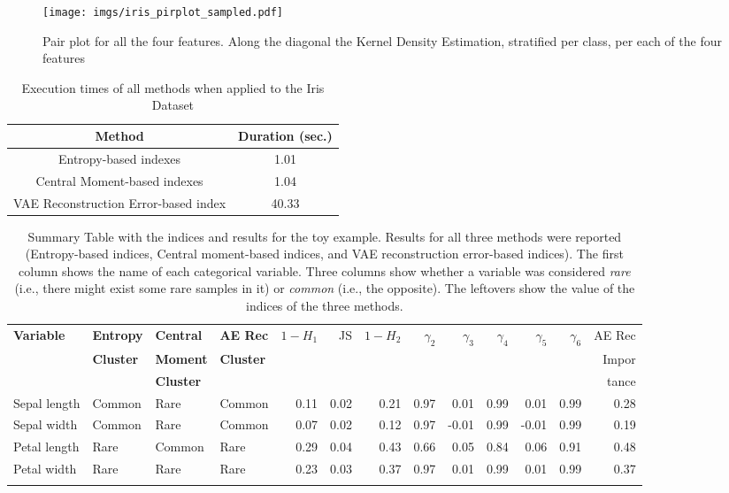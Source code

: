 \begin{figure}
    \centering
    \texttt{[image: imgs/iris\_pirplot\_sampled.pdf]}
    \caption{Pair plot for all the four features. Along the diagonal the Kernel Density Estimation, stratified per class, per each of the four features}
    \label{fig:toy_example_marginals}
\end{figure}
\begin{table}
    \centering
    \begin{tabular}{|c|c|}
    \hline
    \textbf{Method} & \textbf{Duration (sec.)} \\
    \hline
     Entropy-based indexes    &  1.01\\
     Central Moment-based indexes    & 1.04\\
     VAE Reconstruction Error-based index & 40.33\\
     \hline
    \end{tabular}
    \caption{Execution times of all methods when applied to the Iris Dataset}
    \label{tab: execution_times}
\end{table}
\begin{footnotesize}
\begin{longtable}{|l|l|l|l|r|r|r|r|r|r|r|r|r|}
    \hline
    \textbf{Variable}& \textbf{Entropy} & \textbf{Central} & \textbf{AE Rec} &     $1-H_1$ & JS & $1-H_2$ &  $\gamma_2$ &  $\gamma_3$ &  $\gamma_4$ &  $\gamma_5$ &  $\gamma_6$ &  AE Rec  \\
     & \textbf{Cluster} & \textbf{Moment} & \textbf{Cluster} & & &  & &  & &  &  & Impor \\
     &  & \textbf{Cluster} & & & &  & &  & &  &  & tance \\
    \hline
    Sepal length &          Common &                   Rare &           Common &  0.11 &  0.02 &  0.21 &    0.97 &    0.01 &    0.99 &    0.01 &    0.99 &           0.28 \\
    Sepal width &          Common &                   Rare &           Common &  0.07&  0.02&  0.12&  0.97 &   -0.01 &    0.99 &  -0.01 &    0.99 &           0.19 \\
    Petal length &            Rare &                 Common &           Rare &  0.29 &  0.04 &  0.43 &    0.66 &    0.05&    0.84 &    0.06 &    0.91 &           0.48\\
    Petal width &            Rare &                   Rare &           Rare &  0.23 &  0.03 &  0.37 &    0.97&    0.01&    0.99&    0.01&    0.99&           0.37 \\
    \hline
    \caption{Summary Table with the indices and results for the toy example. Results for all three methods were reported (Entropy-based indices, Central moment-based indices, and VAE reconstruction error-based indices). 
    The first column shows the name of each categorical variable. Three columns show whether a variable was considered \emph{rare} (i.e., there might exist some rare samples in it) or \emph{common} (i.e., the opposite). The leftovers show the value of the indices of the three methods.
    }
    \label{tab: summary_table_indices_toy_example}
\end{longtable}
\end{footnotesize}

